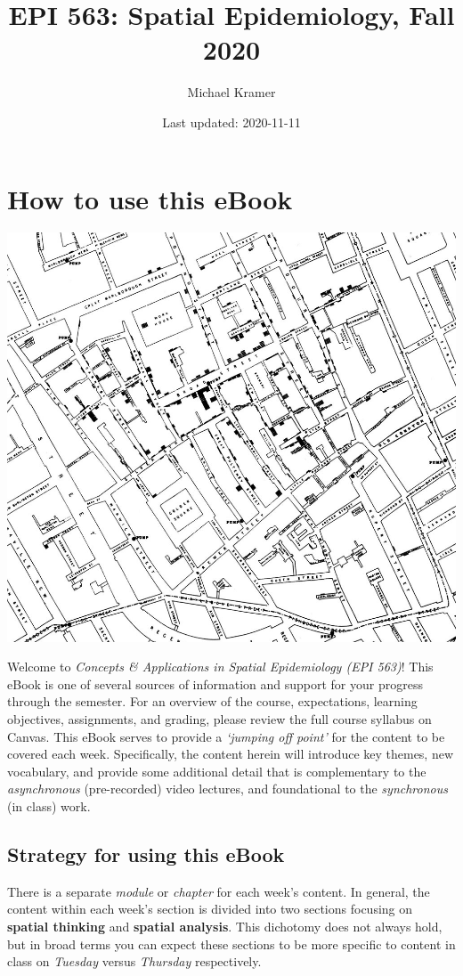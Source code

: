 \documentclass[
]{book}
\title{EPI 563: Spatial Epidemiology, Fall 2020}
\author{Michael Kramer}
\date{Last updated: 2020-11-11}
\begin{document}
\maketitle

{
\setcounter{tocdepth}{1}
\tableofcontents
}
\hypertarget{how-to-use-this-ebook}{%
\chapter*{How to use this eBook}\label{how-to-use-this-ebook}}

\begin{center}\includegraphics[width=0.5\linewidth]{images/John-Snows-cholera-map-of-009} \end{center}

Welcome to \emph{Concepts \& Applications in Spatial Epidemiology (EPI 563)}! This eBook is one of several sources of information and support for your progress through the semester. For an overview of the course, expectations, learning objectives, assignments, and grading, please review the full course syllabus on Canvas. This eBook serves to provide a \emph{`jumping off point'} for the content to be covered each week. Specifically, the content herein will introduce key themes, new vocabulary, and provide some additional detail that is complementary to the \emph{asynchronous} (pre-recorded) video lectures, and foundational to the \emph{synchronous} (in class) work.

\hypertarget{strategy-for-using-this-ebook}{%
\section*{Strategy for using this eBook}\label{strategy-for-using-this-ebook}}

There is a separate \emph{module} or \emph{chapter} for each week's content. In general, the content within each week's section is divided into two sections focusing on \textbf{spatial thinking} and \textbf{spatial analysis}. This dichotomy does not always hold, but in broad terms you can expect these sections to be more specific to content in class on \emph{Tuesday} versus \emph{Thursday} respectively.
\end{document}
